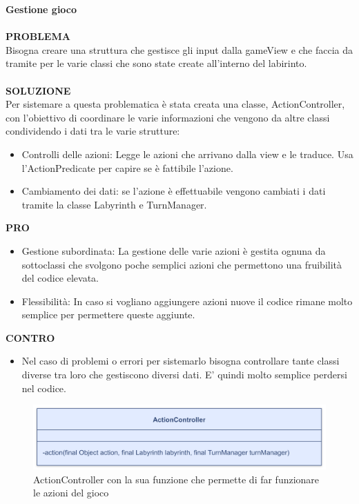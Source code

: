 \documentclass[a4paper,12pt]{report}
\begin{document}
\textbf{Gestione gioco}
\\
\\
\textbf{PROBLEMA}
\\
Bisogna creare una struttura che gestisce gli input dalla gameView e che faccia da tramite per le varie classi che 
sono state create all'interno del labirinto.
\\
\\
\textbf{SOLUZIONE}
\\
Per sistemare a questa problematica è stata creata una classe, ActionController, con l'obiettivo di coordinare le varie informazioni che vengono da 
altre classi condividendo i dati tra le varie strutture:
\begin{itemize}
	\item Controlli delle azioni: Legge le azioni che arrivano dalla view e le traduce. Usa l'ActionPredicate per capire se è fattibile l'azione.
	\item Cambiamento dei dati: se l'azione è effettuabile vengono cambiati i dati tramite la classe Labyrinth e TurnManager.
\end{itemize}
\textbf{PRO}
\\
\begin{itemize}
	\item Gestione subordinata: La gestione delle varie azioni è gestita ognuna da sottoclassi che svolgono poche semplici azioni che permettono una
	fruibilità del codice elevata.
	\item Flessibilità: In caso si vogliano aggiungere azioni nuove il codice rimane molto semplice per permettere queste aggiunte.
\end{itemize}
\textbf{CONTRO}
\begin{itemize}
	\item Nel caso di problemi o errori per sistemarlo bisogna controllare tante classi diverse tra loro che gestiscono diversi dati. E' quindi 
	molto semplice perdersi nel codice.
\end{itemize}
\begin{figure}[H]
	\centering{}
	\includegraphics[width=12cm]{img/ActionController.png}
	\caption{ActionController con la sua funzione che permette di far funzionare le azioni del gioco}
	\label{img:ActionController}
\end{figure}
\end{document}
